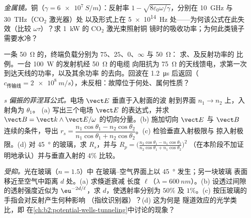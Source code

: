 \begin{exercise}[$\star\star$]\label{exo:b2:wave-interfaces:8}
\emph{金属镜。}铜（$\gamma = \qty{6e7}{S/m}$）：反射率 $1 -
\sqrt{8\varepsilon_0\omega/\gamma}$，分别在 \qty{10}{GHz} 与 \qty{30}{THz}（CO$_2$ 激光器）处
以及形式上在 \qty{5e14}{Hz} 处——为何该公式在此失效（比较
$\omega\tau$）？求 \qty{1}{kW} 的 CO$_2$ 激光束照射铜
镜时的吸收功率；为何此类镜子需要水冷？
\end{exercise}

\begin{exercise}[$\star\star$]\label{exo:b2:wave-interfaces:9}
一条 \qty{50}{\ohm} 的，终端负载分别为 $75$、$25$、$0$、$\infty$ 与 \qty{50}{\ohm}：
求、及反射功率的
比例。一台 \qty{100}{W} 的发射机经 \qty{50}{\ohm} 的电缆
向阻抗为 \qty{75}{\ohm} 的天线馈电，求第一次到达天线的功率，以及其余功率
的去向。回波在 \qty{1.2}{\micro s} 后返回（$c_{\text{传输线}}
= \qty{2e8}{m/s}$），未反相：故障位于何处、属何性质？
\end{exercise}

\begin{exercise}[$\star\star\star$]\label{exo:b2:wave-interfaces:10}
\emph{s 偏振的菲涅耳公式。}电场 $\vect E$ 垂直于入射面的波
射到界面 $n_1 \to n_2$ 上，入射角为 $\theta_1$。
(a) 写出三个电场 $\vect E$ 的表达式，并求
$\vect B = \vect k\wedge\vect E/\omega$ 的切向分量。(b) 施加切向
$\vect E$ 与 $\vect B$ 连续的条件，导出 $r_s = \dfrac{n_1\cos\theta_1 - n_2\cos\theta_2}
{n_1\cos\theta_1 + n_2\cos\theta_2}$。(c) 检验垂直入射极限与
掠入射极限。(d) 对 \qty{45}{\degree} 的玻璃，求 $R_s$，并与 $R_p
= \bigl(\frac{n_2\cos\theta_1 - n_1\cos\theta_2}{n_2\cos\theta_1 + n_1\cos\theta_2}\bigr)^2$
（在本阶段不加证明地承认）并与垂直入射的 $4\%$ 比较。
\end{exercise}

\begin{exercise}[$\star\star\star$]\label{exo:b2:wave-interfaces:11}
\emph{受抑。}光在玻璃（$n = 1.5$）中
在玻璃–空气界面上以 \qty{45}{\degree} 发生；另一块玻璃
表面移近至空气中距离 $d$ 处。(a) 求倏逝衰减
长度 $\ell$（$\lambda = \qty{600}{nm}$）。(b) 设透过间隙的透射强度近似为
$\eu^{-2d/\ell}$，求 $d$，使透射率分别为 $50\%$
及 $1\%$。(c) 按压玻璃的手指会对反射产生何种影响
（指纹识别器）？(d) 这为何是
隧道效应的光学类比，即
在\cref{ch:b2:potential-wells-tunneling}中讨论的现象？
\end{exercise}

